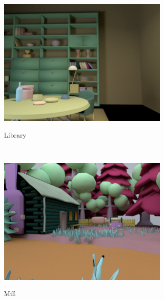 \documentclass{jov}
\begin{document}
\begin{figure}[t]
\centering
\begin{subfigure}[b]{0.22 \textwidth}
        \caption{Library }
        \includegraphics[width=\textwidth]{../FiguresDraft5/Figure2/Figure2_a.png}
        \label{fig:baseSceneLibrary}
    \end{subfigure}
    ~
    \begin{subfigure}[b]{0.22 \textwidth}
        \caption{Mill}    
        \includegraphics[width=\textwidth]{../FiguresDraft5/Figure2/Figure2_b.png}
        \label{fig:baseSceneMill}
    \end{subfigure}    
    ~
    \begin{subfigure}[b]{0.22 \textwidth}

\end{subfigure}
\end{figure}
\end{document}
